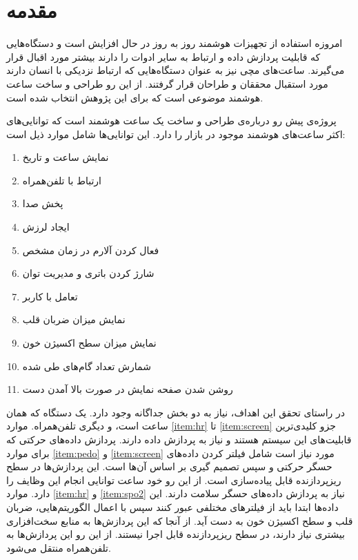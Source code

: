 
\chapter{مقدمه}

امروزه استفاده از تجهیزات هوشمند روز به روز در حال افزایش است و دستگاه‌هایی که قابلیت پردازش داده و ارتباط به سایر ادوات را دارند بیشتر مورد اقبال قرار می‌گیرند. ساعت‌های مچی نیز به عنوان دستگاه‌هایی که ارتباط نزدیکی با انسان دارند مورد استقبال محققان و طراحان قرار گرفتند. از این رو طراحی و ساخت ساعت هوشمند موضوعی است که برای این پژوهش انتخاب شده است.

پروژه‌ی پیش رو درباره‌ی طراحی و ساخت یک ساعت هوشمند است که توانایی‌های اکثر ساعت‌های هوشمند موجود در بازار را دارد. این توانایی‌ها شامل موارد ذیل است:
\begin{enumerate}
	\item نمایش ساعت و تاریخ
	\item ارتباط با تلفن‌همراه
	\item پخش صدا
	\item ایجاد لرزش
	\item فعال کردن آلارم در زمان مشخص
	\item شارژ کردن باتری و مدیریت توان
	\item تعامل با کاربر
	\item نمایش میزان ضربان قلب \label{item:hr}
	\item نمایش میزان سطح اکسیژن خون \label{item:spo2}
	\item شمارش تعداد گام‌های طی شده \label{item:pedo}
	\item روشن شدن صفحه نمایش در صورت بالا آمدن دست \label{item:screen}
\end{enumerate}

در راستای تحقق این اهداف، نیاز به دو بخش جداگانه وجود دارد. یک دستگاه که همان ساعت است، و دیگری تلفن‌همراه. موارد \ref{item:hr} تا \ref{item:screen} جزو کلیدی‌ترین قابلیت‌های این سیستم هستند و نیاز به پردازش داده دارند. پردازش داده‌های حرکتی که برای موارد \ref{item:pedo} و \ref{item:screen} مورد نیاز است شامل فیلتر کردن داده‌های حسگر حرکتی و سپس تصمیم گیری بر اساس آن‌ها است. این پردازش‌ها در سطح ریزپردازنده قابل پیاده‌سازی است. از این رو خود ساعت توانایی انجام این وظایف را دارد. موارد \ref{item:hr} و \ref{item:spo2} نیاز به پردازش داده‌های حسگر سلامت دارند. این داده‌ها ابتدا باید از فیلترهای مختلفی عبور کنند سپس با اعمال الگوریتم‌هایی، ضربان قلب و سطح اکسیژن خون به دست آید. از آنجا که این پردازش‌ها به منابع سخت‌افزاری بیشتری نیاز دارند، در سطح ریزپردازنده قابل اجرا نیستند. از این رو این پردازش‌ها به تلفن‌همراه منتقل می‌شود.

